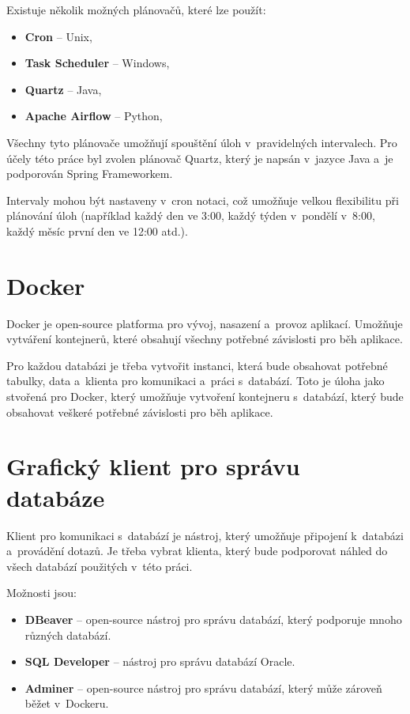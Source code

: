 Existuje několik možných plánovačů, které lze použít:
\begin{itemize}
    \item \textbf{Cron} -- Unix,
    \item \textbf{Task Scheduler} -- Windows,
    \item \textbf{Quartz} -- Java,
    \item \textbf{Apache Airflow} -- Python,
\end{itemize}

Všechny tyto plánovače umožňují spouštění úloh v~pravidelných intervalech.
Pro účely této práce byl zvolen plánovač Quartz, který je napsán v~jazyce Java
a~je podporován Spring Frameworkem.

Intervaly mohou být nastaveny v~cron notaci, což umožňuje velkou flexibilitu při plánování úloh
(například každý den ve 3:00, každý týden v~pondělí v~8:00, každý měsíc první den ve 12:00 atd.).

\section{Docker}
Docker je open-source platforma pro vývoj, nasazení a~provoz aplikací.
Umožňuje vytváření kontejnerů, které obsahují všechny potřebné závislosti pro běh aplikace.

Pro každou databázi je třeba vytvořit instanci, která bude obsahovat potřebné tabulky, data
a~klienta pro komunikaci a~práci s~databází. Toto je úloha jako stvořená pro Docker,
který umožňuje vytvoření kontejneru s~databází, který bude obsahovat veškeré potřebné závislosti
pro běh aplikace.
\cite{docker}

\newpage

\section{Grafický klient pro správu databáze}
Klient pro komunikaci s~databází je nástroj, který umožňuje připojení k~databázi a~provádění dotazů.
Je třeba vybrat klienta, který bude podporovat náhled do všech databází použitých v~této práci.

Možnosti jsou:
\begin{itemize}
    \item \textbf{DBeaver} -- open-source nástroj pro správu databází, který podporuje mnoho různých databází.
    \item \textbf{SQL Developer} -- nástroj pro správu databází Oracle.
    \item \textbf{Adminer} -- open-source nástroj pro správu databází, který může zároveň běžet v~Dockeru.
\end{itemize}

